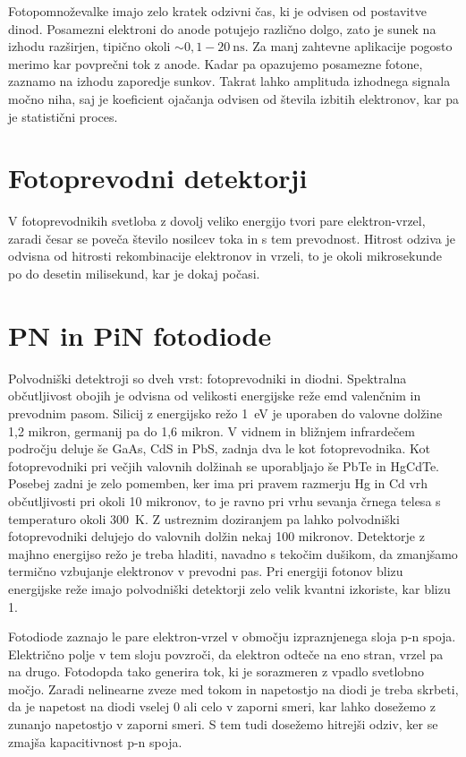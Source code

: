 Fotopomnoževalke imajo zelo kratek odzivni čas, ki je odvisen od postavitve dinod. Posamezni 
elektroni do anode potujejo različno dolgo, zato je sunek na izhodu 
razširjen, tipično okoli $\sim 0,1-20~\si{\nano\second}$.  
Za manj zahtevne aplikacije pogosto merimo kar povprečni tok z anode. Kadar pa opazujemo
posamezne fotone, zaznamo na izhodu zaporedje sunkov. Takrat lahko 
amplituda izhodnega signala močno niha, saj je koeficient ojačanja 
odvisen od števila izbitih elektronov, kar pa je statistični proces. 




\section{Fotoprevodni detektorji}
V fotoprevodnikih svetloba z dovolj veliko energijo tvori pare elektron-vrzel, zaradi  česar
se poveča število nosilcev toka in s tem prevodnost. Hitrost odziva je odvisna od hitrosti
rekombinacije elektronov in vrzeli, to je okoli mikrosekunde po do desetin milisekund, kar
je dokaj počasi. 

\section{PN in PiN fotodiode}
Polvodniški detektroji so dveh vrst: fotoprevodniki in diodni. Spektralna občutljivost
obojih je odvisna od velikosti energijske reže emd valenčnim in prevodnim pasom. Silicij
z energijsko režo 1~eV je uporaben do valovne dolžine 1,2 mikron, germanij pa do 1,6 mikron.
V vidnem in bližnjem infrardečem področju deluje še GaAs, CdS in PbS, zadnja dva le kot
fotoprevodnika. Kot fotoprevodniki pri večjih valovnih dolžinah se uporabljajo  še PbTe
in HgCdTe. Posebej zadni je zelo pomemben, ker ima pri pravem razmerju Hg in Cd vrh občutljivosti
pri okoli 10 mikronov, to je ravno pri vrhu sevanja črnega telesa s temperaturo okoli 300~K. 
Z ustreznim doziranjem pa lahko polvodniški fotoprevodniki delujejo do valovnih dolžin nekaj 100 mikronov.
Detektorje  z majhno energijso režo je treba hladiti, navadno s tekočim dušikom, da zmanjšamo
termično vzbujanje elektronov v prevodni pas. Pri energiji fotonov blizu energijske reže 
imajo polvodniški detektorji zelo velik kvantni izkoriste, kar blizu 1.

Fotodiode zaznajo le pare elektron-vrzel v območju izpraznjenega sloja p-n spoja. Električno 
polje v tem sloju povzroči, da elektron odteče na eno stran, vrzel pa na drugo. Fotodopda tako
generira tok, ki je sorazmeren z vpadlo svetlobno močjo. Zaradi nelinearne zveze med tokom in napetostjo
na diodi je treba skrbeti, da je napetost na diodi vselej 0 ali celo v zaporni smeri, kar lahko
dosežemo z zunanjo napetostjo v zaporni smeri. S tem tudi dosežemo hitrejši odziv, ker 
se zmajša kapacitivnost p-n spoja. 

